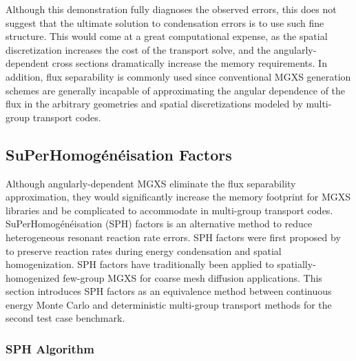 Although this demonstration fully diagnoses the observed errors, this does not suggest that the ultimate solution to condensation errors is to use such fine structure. This would come at a great computational expense, as the spatial discretization increases the cost of the transport solve, and the angularly-dependent cross sections dramatically increase the memory requirements. In addition, flux separability is commonly used since conventional MGXS generation schemes are generally incapable of approximating the angular dependence of the flux in the arbitrary geometries and spatial discretizations modeled by multi-group transport codes.



\subsection{SuPerHomog\'{e}n\'{e}isation Factors}
\label{subsec:sph}

Although angularly-dependent MGXS eliminate the flux separability approximation, they would significantly increase the memory footprint for MGXS libraries and be complicated to accommodate in multi-group transport codes. SuPerHomog\'{e}n\'{e}isation (SPH) factors is an alternative method to reduce heterogeneous resonant reaction rate errors. SPH factors were first proposed by~\cite{hebert1993consistent} to preserve reaction rates during energy condensation and spatial homogenization. SPH factors have traditionally been applied to spatially-homogenized few-group MGXS for coarse mesh diffusion applications. This section introduces SPH factors as an equivalence method between continuous energy Monte Carlo and deterministic multi-group transport methods for the second test case benchmark.

\subsubsection{SPH Algorithm}
\label{subsubsec:sph-algorithm}


